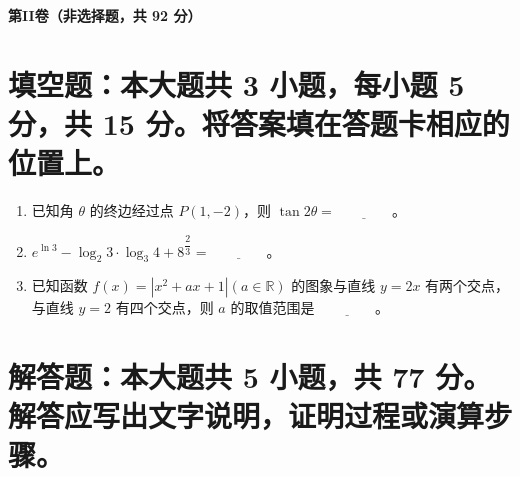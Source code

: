 \documentclass[10pt]{exam-zh}
\begin{document}
	\begin{center}
		\large	\textbf{第II卷（非选择题，共 92 分）}
	\end{center}
	\section{填空题：本大题共 3 小题，每小题 5 分，共 15 分。将答案填在答题卡相应的位置上。}
	
	\begin{enumerate}[leftmargin=*, label=\arabic*.]
		\item[12.] 已知角 \(\theta\) 的终边经过点 \( P(1,-2) \)，则 \(\tan 2\theta = \underline{\qquad\qquad}\)。
		
		\item[13.] \( e^{\ln 3} - \log_2 3 \cdot \log_3 4 + 8^{\dfrac{2}{3}} = \underline{\qquad\qquad}\)。
		
		\item[14.] 已知函数 \( f(x) = |x^2 + ax + 1| (a \in \mathbb{R}) \) 的图象与直线 \( y = 2x \) 有两个交点，与直线 \( y = 2 \) 有四个交点，则 \( a \) 的取值范围是 \(\underline{\qquad\qquad}\)。
	\end{enumerate}
	
	\section{解答题：本大题共 5 小题，共 77 分。解答应写出文字说明，证明过程或演算步骤。}
	
\end{document}

